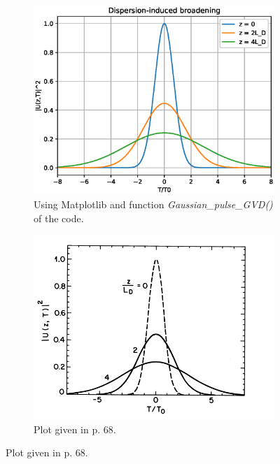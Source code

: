        \begin{figure}[label={fig:gvdmtp}, caption={Effect of GVD in a Gaussian pulse following Eq. \eqref{eq_ugvdg}.}]
        \begin{subfigure}[b]{.53\textwidth}
		    \centering	
            \includegraphics[width=1\textwidth]{figures/chap3/gvdonlygaus.eps}
            \caption{Using Matplotlib and function \emph{Gaussian\_pulse\_GVD()} of the code.}\label{fig:gvdmtp1}
        \end{subfigure}
        \hfill
        \begin{subfigure}[b]{.53\textwidth}
		    \centering	
            \includegraphics[width=1\textwidth]{figures/chap3/gvdgausagr.png}
            \caption{Plot given in \citep{AgrawalBook} p. 68.}\label{fig:gvdmtp2}
        \end{subfigure}
        \end{figure}
        
